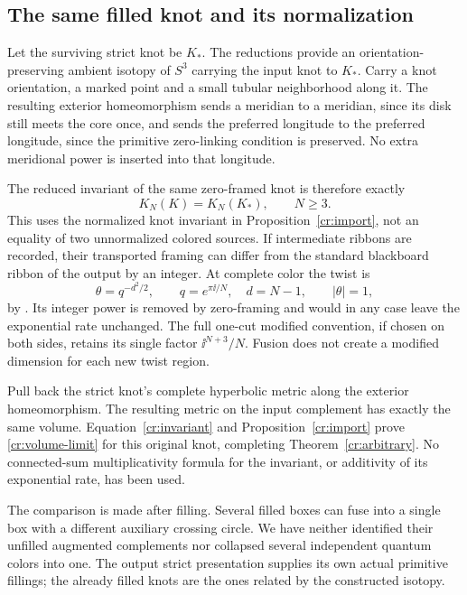 \subsection{The same filled knot and its normalization}

Let the surviving strict knot be $K_*$. The reductions provide an orientation-preserving ambient isotopy of $S^3$ carrying the input knot to $K_*$. Carry a knot orientation, a marked point and a small tubular neighborhood along it. The resulting exterior homeomorphism sends a meridian to a meridian, since its disk still meets the core once, and sends the preferred longitude to the preferred longitude, since the primitive zero-linking condition is preserved. No extra meridional power is inserted into that longitude.

The reduced invariant of the same zero-framed knot is therefore exactly
\begin{equation}\label{cr:invariant}
                   K_N(K)=K_N(K_*),\qquad N\ge3.
\end{equation}
This uses the normalized knot invariant in Proposition~\ref{cr:import}, not an equality of two unnormalized colored sources. If intermediate ribbons are recorded, their transported framing can differ from the standard blackboard ribbon of the output by an integer. At complete color the twist is
\[
 \theta=q^{-d^2/2},\qquad q=e^{\pi\ii/N},\quad d=N-1,
                  \qquad |\theta|=1,
\]
by \cite[Theorem 10.1]{Finite}. Its integer power is removed by zero-framing and would in any case leave the exponential rate unchanged. The full one-cut modified convention, if chosen on both sides, retains its single factor $\ii^{N+3}/N$. Fusion does not create a modified dimension for each new twist region.

Pull back the strict knot's complete hyperbolic metric along the exterior homeomorphism. The resulting metric on the input complement has exactly the same volume. Equation~\eqref{cr:invariant} and Proposition~\ref{cr:import} prove \eqref{cr:volume-limit} for this original knot, completing Theorem~\ref{cr:arbitrary}. No connected-sum multiplicativity formula for the invariant, or additivity of its exponential rate, has been used.

The comparison is made after filling. Several filled boxes can fuse into a single box with a different auxiliary crossing circle. We have neither identified their unfilled augmented complements nor collapsed several independent quantum colors into one. The output strict presentation supplies its own actual primitive fillings; the already filled knots are the ones related by the constructed isotopy.

